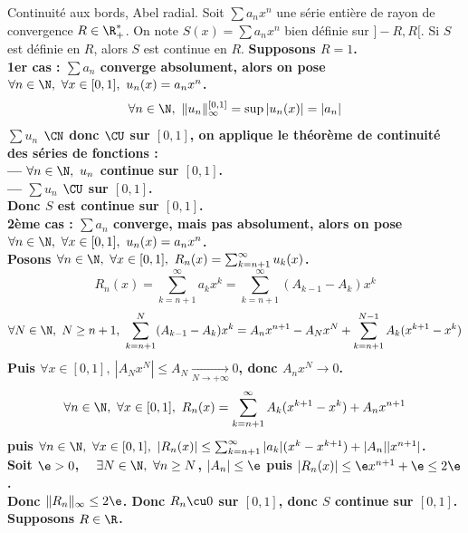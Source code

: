 \documentclass[11pt]{article}
\begin{document}
\begin{thm}{Continuité aux bords, Abel radial.}{}
    Soit $\sum a_nx^n$ une série entière de rayon de convergence $R\in\R_+^*$. On note $S(x)=\sum a_nx^n$ bien définie sur $]-R,R[$. Si $S$ est définie en $R$, alors $S$ est continue en $R$.
    \tcblower
    \bf{Supposons $R=1$}.\\
    1er cas : $\sum a_n$ converge absolument, alors on pose $\forall n \in \N, ~ \forall x \in [0,1], ~ u_n(x)=a_nx^n$.
    \begin{equation*}
        \forall n \in \N, ~ \|u_n\|_\infty^{[0,1]}=\sup|u_n(x)|=|a_n|
    \end{equation*}
    $\sum u_n$ $\CN$ donc $\CU$ sur $[0,1]$, on applique le théorème de continuité des séries de fonctions :\\
    --- $\forall n \in \N, ~ u_n$ continue sur $[0,1]$.\\
    --- $\sum u_n$ $\CU$ sur $[0,1]$.\\
    Donc $S$ est continue sur $[0,1]$.\\
    2ème cas : $\sum a_n$ converge, mais pas absolument, alors on pose $\forall n \in \N ,~ \forall x \in [0,1], ~ u_n(x)=a_nx^n$.\\
    Posons $\forall n \in \N, ~ \forall x \in [0,1], ~ R_n(x)=\sum_{k=n+1}^\infty u_k(x)$.
    \begin{equation*}
        R_n(x) = \sum_{k=n+1}^\infty a_kx^k = \sum_{k=n+1}^\infty(A_{k-1} - A_k)x^k
    \end{equation*}
    \begin{equation*}
        \forall N \in \N, ~ N \geq n+1, ~ \sum_{k=n+1}^N(A_{k-1}-A_k)x^k=A_nx^{n+1}-A_Nx^N + \sum_{k=n+1}^{N-1}A_k(x^{k+1}-x^k)
    \end{equation*}
    Puis $\forall x \in [0,1], ~ |A_Nx^N|\leq A_N \xrightarrow[N\to+\infty]{} 0$, donc $A_nx^N\to 0$.
    \begin{equation*}
        \forall n \in \N, ~ \forall x \in [0,1], ~ R_n(x) = \sum_{k=n+1}^\infty A_k(x^{k+1}-x^k) + A_nx^{n+1}
    \end{equation*} 
    puis $\forall n \in \N, ~ \forall x \in [0,1], ~ |R_n(x)|\leq\sum_{k=n+1}^\infty|a_k|(x^k-x^{k+1})+|A_n||x^{n+1}|$.\\
    Soit $\e>0$, ~ $\exists N \in \N, ~ \forall n \geq N$, $|A_n|\leq\e$ puis $|R_n(x)|\leq \e x^{n+1} + \e \leq 2\e$.\\
    Donc $\|R_n\|_\infty \leq 2\e$. Donc $R_n\cu 0$ sur $[0,1]$, donc $S$ continue sur $[0,1]$.\n
    \bf{Supposons $R\in\R$}.\\

\end{thm}
\end{document}
